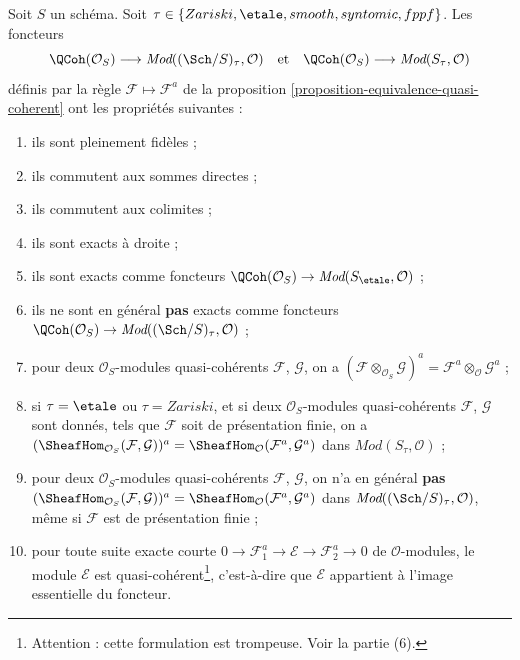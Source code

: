 \begin{lemma}
\label{lemma-equivalence-quasi-coherent-limits}
Soit $S$ un schéma.
Soit $\tau \in \{Zariski, \linebreak[0] \etale,
\linebreak[0] smooth, \linebreak[0] syntomic, \linebreak[0] fppf\}$.
Les foncteurs
$$
\QCoh(\mathcal{O}_S)
\longrightarrow
\textit{Mod}((\Sch/S)_\tau, \mathcal{O})
\quad\text{et}\quad
\QCoh(\mathcal{O}_S)
\longrightarrow
\textit{Mod}(S_\tau, \mathcal{O})
$$
définis par la règle $\mathcal{F} \mapsto \mathcal{F}^a$ de la
proposition \ref{proposition-equivalence-quasi-coherent}
ont les propriétés suivantes :
\begin{enumerate}
\item ils sont pleinement fidèles ;
\item ils commutent aux sommes directes ;
\item ils commutent aux colimites ;
\item ils sont exacts à droite ;
\item ils sont exacts comme foncteurs
$\QCoh(\mathcal{O}_S) \to \textit{Mod}(S_\etale, \mathcal{O})$ ;
\item ils ne sont en général {\bf pas} exacts comme foncteurs
$\QCoh(\mathcal{O}_S) \to
\textit{Mod}((\Sch/S)_\tau, \mathcal{O})$ ;
\item pour deux $\mathcal{O}_S$-modules quasi-cohérents
$\mathcal{F}$, $\mathcal{G}$, on a
$(\mathcal{F} \otimes_{\mathcal{O}_S} \mathcal{G})^a =
\mathcal{F}^a \otimes_\mathcal{O} \mathcal{G}^a$ ;
\item si $\tau = \etale$ ou $\tau = Zariski$, et si deux
$\mathcal{O}_S$-modules quasi-cohérents $\mathcal{F}$, $\mathcal{G}$ sont
donnés, tels que $\mathcal{F}$ soit de présentation finie, on a
$(\SheafHom_{\mathcal{O}_S}(\mathcal{F}, \mathcal{G}))^a =
\SheafHom_\mathcal{O}(\mathcal{F}^a, \mathcal{G}^a)$ dans
$\textit{Mod}(S_\tau, \mathcal{O})$ ;
\item pour deux $\mathcal{O}_S$-modules quasi-cohérents
$\mathcal{F}$, $\mathcal{G}$, on n'a en général {\bf pas}
$(\SheafHom_{\mathcal{O}_S}(\mathcal{F}, \mathcal{G}))^a =
\SheafHom_\mathcal{O}(\mathcal{F}^a, \mathcal{G}^a)$
dans $\textit{Mod}((\Sch/S)_\tau, \mathcal{O})$, même si
$\mathcal{F}$ est de présentation finie ;
\item pour toute suite exacte courte
$0 \to \mathcal{F}_1^a \to \mathcal{E} \to \mathcal{F}_2^a \to 0$
de $\mathcal{O}$-modules, le module $\mathcal{E}$ est
quasi-cohérent\footnote{Attention : cette formulation est trompeuse. Voir la
partie (6).}, c'est-à-dire que $\mathcal{E}$ appartient à l'image essentielle
du foncteur.
\end{enumerate}
\end{lemma}

